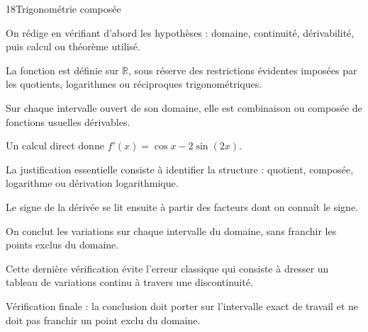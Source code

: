 \documentclass[11pt,a4paper]{article}
\newcommand{\R}{\mathbb{R}}
\begin{document}
\begin{corrbox}{18}{Trigonométrie composée}

\begin{methodebox}
On rédige en vérifiant d'abord les hypothèses : domaine, continuité, dérivabilité, puis calcul ou théorème utilisé.
\end{methodebox}

La fonction est définie sur $\R$, sous réserve des restrictions évidentes imposées par les quotients, logarithmes ou réciproques trigonométriques.


Sur chaque intervalle ouvert de son domaine, elle est combinaison ou composée de fonctions usuelles dérivables.


Un calcul direct donne $f'(x)=\cos x-2\sin(2x)$.


La justification essentielle consiste à identifier la structure : quotient, composée, logarithme ou dérivation logarithmique.


Le signe de la dérivée se lit ensuite à partir des facteurs dont on connaît le signe.


On conclut les variations sur chaque intervalle du domaine, sans franchir les points exclus du domaine.


Cette dernière vérification évite l'erreur classique qui consiste à dresser un tableau de variations continu à travers une discontinuité.


\begin{attentionbox}
Vérification finale : la conclusion doit porter sur l'intervalle exact de travail et ne doit pas franchir un point exclu du domaine.
\end{attentionbox}

\end{corrbox}
\end{document}
